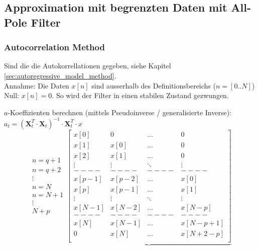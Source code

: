 \clearpage
\subsection{Approximation mit begrenzten  Daten mit All-Pole Filter}
\subsubsection{Autocorrelation Method }
Sind die die Autokorrellationen gegeben, siehe Kapitel \ref{sec:autoregressive_model_method}.\\
Annahme: Die Daten $x[n]$ sind ausserhalb des Definitionsbereichs ($n=[0..N]$) Null: $x[n]=0$. So wird der Filter in einen stabilen Zustand gezwungen.
\renewcommand{\arraystretch}{1.0}

\begin{aufzaehlung}
	\item $a$-Koeffizienten berechnen (mittels Pseudoinverse / generalisierte Inverse): $a_t = \left(\bm X_t^T \cdot \bm  X_t\right)^{-1} \cdot \bm X_t^T \cdot x$
  		 \small
			$$
		\begin{matrix} n=q+1\\ n=q+2\\ \vdots \\ n=N\\ n=N+1\\ \vdots \\ N+p
		\end{matrix}
		\underbrace{\begin{bmatrix}
    		x[0] & 0 & \hdots & 0 \\ 
    		x[1] & x[0] & \hdots & 0 \\ 
    		x[2] & x[1] & \hdots & 0 \\        
    		\vdots & \vdots & \ddots & \vdots \\
    		----&----&----&----\\                
    		x[p-1] & x[p-2] & \hdots & x[0] \\                                   
    		x[p] & x[p-1] & \hdots & x[1] \\      
    		\vdots & \vdots & \ddots & \vdots \\                        
    		x[N-1] & x[N-2] & \hdots & x[N-p] \\ 
    		----&----&----&----\\                            
    		x[N] & x[N-1] & \hdots & x[N-p+1] \\ 
    		0 & x[N] & \hdots & x[N+2-p] \\

\end{bmatrix}}$$
\end{aufzaehlung}
